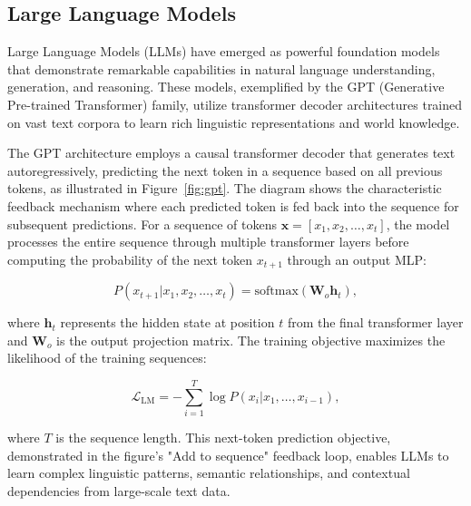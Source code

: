\subsection{Large Language Models}

Large Language Models (LLMs) have emerged as powerful foundation models that demonstrate remarkable capabilities in natural language understanding, generation, and reasoning. These models, exemplified by the GPT (Generative Pre-trained Transformer) family, utilize transformer decoder architectures trained on vast text corpora to learn rich linguistic representations and world knowledge.

The GPT architecture employs a causal transformer decoder that generates text autoregressively, predicting the next token in a sequence based on all previous tokens, as illustrated in Figure~\ref{fig:gpt}. The diagram shows the characteristic feedback mechanism where each predicted token is fed back into the sequence for subsequent predictions. For a sequence of tokens $\mathbf{x} = [x_1, x_2, \ldots, x_t]$, the model processes the entire sequence through multiple transformer layers before computing the probability of the next token $x_{t+1}$ through an output MLP:

\begin{equation}
P(x_{t+1} | x_1, x_2, \ldots, x_t) = \text{softmax}(\mathbf{W}_o \mathbf{h}_t),
\end{equation}

where $\mathbf{h}_t$ represents the hidden state at position $t$ from the final transformer layer and $\mathbf{W}_o$ is the output projection matrix. The training objective maximizes the likelihood of the training sequences:

\begin{equation}
\mathcal{L}_{\text{LM}} = -\sum_{i=1}^{T} \log P(x_i | x_1, \ldots, x_{i-1}),
\end{equation}

where $T$ is the sequence length. This next-token prediction objective, demonstrated in the figure's "Add to sequence" feedback loop, enables LLMs to learn complex linguistic patterns, semantic relationships, and contextual dependencies from large-scale text data.

